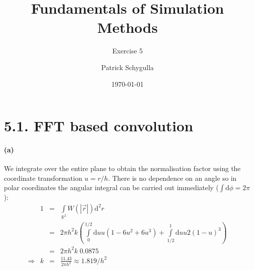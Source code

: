 \documentclass{scrartcl}
\title{Fundamentals of Simulation Methods}
\subtitle{Exercise 5}
\author{Patrick Schygulla}
\date{\today}
\begin{document}
\maketitle

\section*{5.1. FFT based convolution}
\paragraph*{(a)} We integrate over the entire plane to obtain the normalisation factor using the coordinate transformation $u = r/h$. There is no dependence on an angle so in polar coordinates the angular integral can be carried out immediately ($\int\mathrm{d}\phi = 2\pi$):
\begin{equation*}
	\begin{array}{rrcl}
	&	1 & = & \int\limits_{\mathbb{R}^2} W(|\vec{r}|)\mathrm{d}^2r \\
	&	  & = & 2\pi h^2 k \left( \int\limits_0^{1/2}\mathrm{d}u u(1-6u^2+6u^3) + \int\limits_{1/2}^1\mathrm{d}u u2(1-u)^3 \right) \\
	&	  & = & 2\pi h^2 k \; 0.0875 \\
	\Rightarrow & k & = & \frac{11.43}{2\pi h^2} \approx 1.819/h^2
	\end{array}
\end{equation*}
\end{document}
